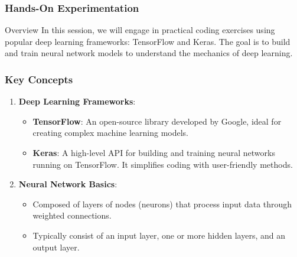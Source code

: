 \documentclass{beamer}
\begin{document}
\begin{frame}
    \frametitle{Hands-On Experimentation}
    \begin{block}{Overview}
        In this session, we will engage in practical coding exercises using popular deep learning frameworks: TensorFlow and Keras. The goal is to build and train neural network models to understand the mechanics of deep learning.
    \end{block}
\end{frame}

\begin{frame}
    \frametitle{Key Concepts}
    \begin{enumerate}
        \item \textbf{Deep Learning Frameworks}:
            \begin{itemize}
                \item \textbf{TensorFlow}: An open-source library developed by Google, ideal for creating complex machine learning models.
                \item \textbf{Keras}: A high-level API for building and training neural networks running on TensorFlow. It simplifies coding with user-friendly methods.
            \end{itemize}
        \item \textbf{Neural Network Basics}:
            \begin{itemize}
                \item Composed of layers of nodes (neurons) that process input data through weighted connections.
                \item Typically consist of an input layer, one or more hidden layers, and an output layer.
            \end{itemize}
    \end{enumerate}
\end{frame}
\end{document}
